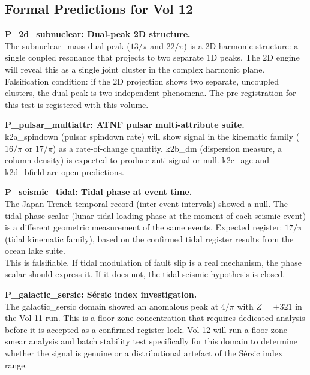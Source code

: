 \documentclass[11pt, letterpaper, openany]{book}
\begin{document}
\begin{empiricalbox}
\section{Formal Predictions for Vol 12}

\begin{predictionbox}
\textbf{P\_2d\_subnuclear: Dual-peak 2D structure.}\\[0.5em]
The subnuclear\_mass dual-peak ($13/\pi$ and $22/\pi$) is a 2D harmonic
structure: a single coupled resonance that projects to two separate 1D peaks.
The 2D engine will reveal this as a single joint cluster in the complex
harmonic plane.\\[0.5em]
Falsification condition: if the 2D projection shows two separate, uncoupled
clusters, the dual-peak is two independent phenomena. The pre-registration
for this test is registered with this volume.
\end{predictionbox}

\begin{predictionbox}
\textbf{P\_pulsar\_multiattr: ATNF pulsar multi-attribute suite.}\\[0.5em]
k2a\_spindown (pulsar spindown rate) will show signal in the kinematic family
($16/\pi$ or $17/\pi$) as a rate-of-change quantity. k2b\_dm (dispersion
measure, a column density) is expected to produce anti-signal or null.
k2c\_age and k2d\_bfield are open predictions.
\end{predictionbox}

\begin{predictionbox}
\textbf{P\_seismic\_tidal: Tidal phase at event time.}\\[0.5em]
The Japan Trench temporal record (inter-event intervals) showed a null.
The tidal phase scalar (lunar tidal loading phase at the moment of each
seismic event) is a different geometric measurement of the same events.
Expected register: $17/\pi$ (tidal kinematic family), based on the
confirmed tidal register results from the ocean lake suite.\\[0.5em]
This is falsifiable. If tidal modulation of fault slip is a real mechanism,
the phase scalar should express it. If it does not, the tidal seismic
hypothesis is closed.
\end{predictionbox}

\begin{predictionbox}
\textbf{P\_galactic\_sersic: S\'{e}rsic index investigation.}\\[0.5em]
The galactic\_sersic domain showed an anomalous peak at $4/\pi$ with
$Z = +321$ in the Vol 11 run. This is a floor-zone concentration that requires
dedicated analysis before it is accepted as a confirmed register lock. Vol 12
will run a floor-zone smear analysis and batch stability test specifically
for this domain to determine whether the signal is genuine or a distributional
artefact of the S\'{e}rsic index range.
\end{predictionbox}


\end{empiricalbox}
\end{document}
